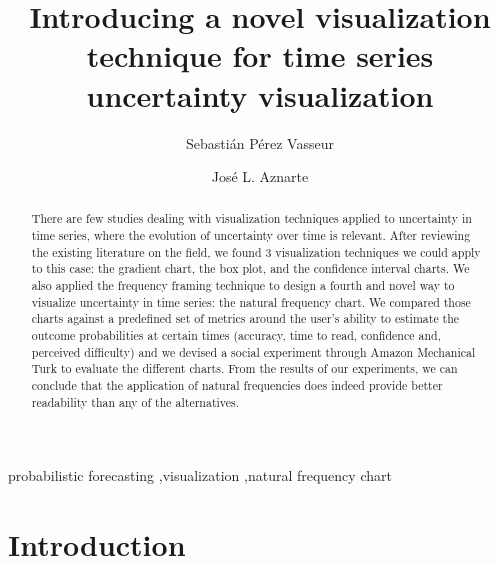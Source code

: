 \documentclass[a4paper,3p,sort&compress]{elsarticle}
\begin{document}
\linenumbers

\newcommand{\no}{NO\textsubscript{2}\xspace}
\newcommand{\ts}{\textsuperscript}

\begin{frontmatter}

  \title{Introducing a novel visualization technique for time series uncertainty visualization}


  \author{Sebasti\'an P\'erez Vasseur}
  \author{Jos\'e L. Aznarte}
  \address{Artificial Intelligence Department\\Universidad Nacional de
    Educaci\'on a Distancia --- UNED\\c/ Juan del Rosal, 16, Madrid, Spain}


\begin{abstract}

There are few studies dealing with visualization techniques applied to uncertainty in time series, 
where the evolution of uncertainty over time is relevant. After reviewing the existing
literature on the field, we found 3 visualization techniques we could apply to
this case: the gradient chart, the box plot, and the confidence interval charts.
We also applied the frequency framing technique to design a fourth and novel way 
to visualize uncertainty in time series: the natural frequency chart. We compared those charts 
against a predefined set of metrics around the user's ability to estimate the outcome 
probabilities at certain times (accuracy, time to read, confidence and, perceived difficulty) 
and we devised a social experiment through Amazon Mechanical Turk to evaluate the different charts. 
From the results of our experiments, we can conclude that the application of natural 
frequencies does indeed provide better readability than any of the alternatives.

\end{abstract}

\begin{keyword}
probabilistic forecasting \sep visualization \sep natural frequency chart
\end{keyword}

\end{frontmatter}


\section{Introduction}
\label{sec:intro}
\end{document}
